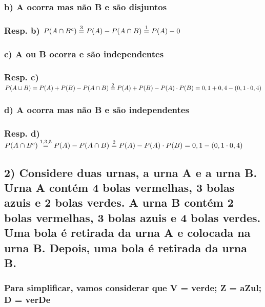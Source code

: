 \documentclass[english]{article}
\begin{document}
\subsubsection*{\textmd{b) A ocorra mas não B e são disjuntos}}


\subsubsection*{\textmd{Resp. b) $P(A\cap B^{c})\protect\overset{3}{=}P(A)-P(A\cap B)\protect\overset{1}{=}P(A)-0$}}


\subsubsection*{\textmd{c) A ou B ocorra e são independentes}}


\subsubsection*{\textmd{Resp. c)$P(A\cup B)\protect\overset{}{=}P(A)+P(B)-P(A\cap B)\protect\overset{2}{=}P(A)+P(B)-P(A)\cdot P(B)=0,1+0,4-(0,1\cdot0,4)$}}


\subsubsection*{\textmd{d) A ocorra mas não B e são independentes}}


\subsubsection*{\textmd{Resp. d) $P(A\cap B^{c})\protect\overset{1,3,5}{=}P(A)-P(A\cap B)\protect\overset{2}{=}P(A)-P(A)\cdot P(B)=0,1-(0,1\cdot0,4)$}}

\textbf{\textcompwordmark{}}


\subsection*{\textmd{2) Considere duas urnas, a urna A e a urna B. Urna A contém
4 bolas vermelhas, 3 bolas azuis e 2 bolas verdes. A urna B contém
2 bolas vermelhas, 3 bolas azuis e 4 bolas verdes. Uma bola é retirada
da urna A e colocada na urna B. Depois, uma bola é retirada da urna
B.}}


\subsubsection*{\textmd{Para simplificar, vamos considerar que V = verde; Z = aZul;
D = verDe}}
\end{document}
